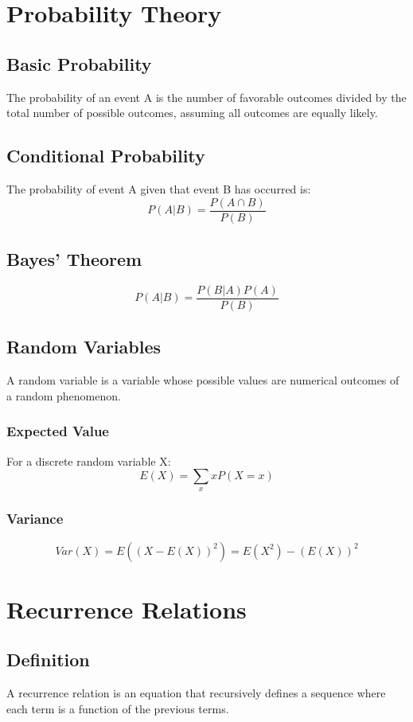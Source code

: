 \documentclass{article}
\begin{document}
\section{Probability Theory}

\subsection{Basic Probability}
The probability of an event A is the number of favorable outcomes divided by the total number of possible outcomes, assuming all outcomes are equally likely.

\subsection{Conditional Probability}
The probability of event A given that event B has occurred is:
$$P(A|B) = \frac{P(A \cap B)}{P(B)}$$

\subsection{Bayes' Theorem}
$$P(A|B) = \frac{P(B|A)P(A)}{P(B)}$$

\subsection{Random Variables}
A random variable is a variable whose possible values are numerical outcomes of a random phenomenon.

\subsubsection{Expected Value}
For a discrete random variable X:
$$E(X) = \sum_{x} x P(X = x)$$

\subsubsection{Variance}
$$Var(X) = E((X - E(X))^2) = E(X^2) - (E(X))^2$$

\section{Recurrence Relations}

\subsection{Definition}
A recurrence relation is an equation that recursively defines a sequence where each term is a function of the previous terms.
\end{document}
